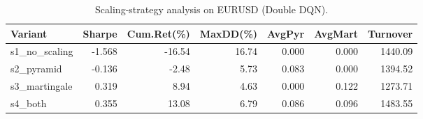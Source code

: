 \begin{table}[!tbp]
\centering
\caption{Scaling-strategy analysis on EURUSD (Double DQN).}
\label{tab:scaling}
\begin{adjustbox}{width=\linewidth}
\begin{tabular}{@{}lrrrrrr@{}}
\toprule
\textbf{Variant} & \textbf{Sharpe} & \textbf{Cum.Ret(\%)} & \textbf{MaxDD(\%)} & \textbf{AvgPyr} & \textbf{AvgMart} & \textbf{Turnover} \\
\midrule
s1\_no\_scaling & -1.568 & -16.54 & 16.74 & 0.000 & 0.000 & 1440.09 \\
s2\_pyramid & -0.136 & -2.48 & 5.73 & 0.083 & 0.000 & 1394.52 \\
s3\_martingale & 0.319 & 8.94 & 4.63 & 0.000 & 0.122 & 1273.71 \\
s4\_both & 0.355 & 13.08 & 6.79 & 0.086 & 0.096 & 1483.55 \\
\bottomrule
\end{tabular}
\end{adjustbox}
\end{table}

